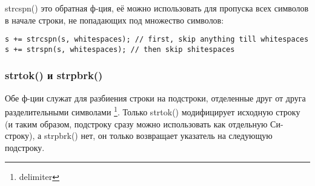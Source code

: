 strcspn() это обратная ф-ция, её можно использовать для пропуска всех символов в начале строки, не попадающих
под множество символов:

\begin{lstlisting}
s += strcspn(s, whitespaces); // first, skip anything till whitespaces
s += strspn(s, whitespaces); // then skip shitespaces
\end{lstlisting}

\subsubsection{strtok() и strpbrk()}

Обе ф-ции служат для разбиения строки на подстроки, отделенные друг от друга разделительными символами
\footnote{delimiter}.
Только strtok() модифицирует исходную строку (и таким образом, подстроку сразу можно использовать
как отдельную Си-строку), а strpbrk() нет, он только возвращает указатель на следующую подстроку.


